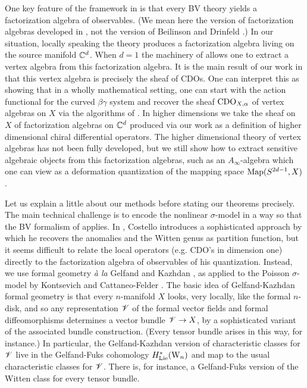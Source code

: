 \documentclass[10pt]{amsart}
\begin{document}
One key feature of the framework in \cite{CG} is that every BV theory yields a factorization algebra of observables. (We mean here the version of factorization algebras developed in \cite{CG}, not the version of Beilinson and Drinfeld \cite{BD}.)
In our situation, locally speaking the theory produces a factorization algebra living on the source manifold $\mathbb C^d$.
When $d=1$ the machinery of \cite{CG} allows one to extract a vertex algebra from this factorization algebra.
It is the main result of our work in \cite{GGW} that this vertex algebra is precisely the sheaf of CDOs.
One can interpret this as showing that in a wholly mathematical setting, one can start with the action functional for the curved $\beta\gamma$ system
and recover the sheaf ${\rm CDO}_{X,\alpha}$ of vertex algebras on $X$ via the algorithms of \cite{CosBook, CG}.
In higher dimensions we take the sheaf on $X$ of factorization algebras on $\mathbb C^d$ produced via our work as a definition of higher dimensional chiral differential operators.
The higher dimensional theory of vertex algebras has not been fully developed, but we still show how to extract sensitive algebraic objects from this factorization algebras, such as an $A_\infty$-algebra which one can view as a deformation quantization of the mapping space ${\rm Map}(S^{2d-1}, X)$. 

Let us explain a little about our methods before stating our theorems precisely. 
The main technical challenge is to encode the nonlinear $\sigma$-model in a way so that the BV formalism of \cite{CostelloRenormalization} applies. 
In \cite{WG2}, Costello introduces a sophisticated approach by which he recovers the anomalies and the Witten genus as partition function, but it seems difficult to relate the local operators (e.g. CDO's in dimension one) directly to the factorization algebra of observables of his quantization. 
Instead, we use formal geometry {\it \`a la} Gelfand and Kazhdan \cite{GK}, as applied to the Poisson $\sigma$-model by Kontsevich \cite{KonDQ} and Cattaneo-Felder \cite{CF}.
The basic idea of Gelfand-Kazhdan formal geometry is that every $n$-manifold $X$ looks, very locally, like the formal $n$-disk, and so any representation $\mathscr V$ of the formal vector fields and formal diffeomorphisms determines a vector bundle $\mathscr V \to X$, by a sophisticated variant of the associated bundle construction. (Every tensor bundle arises in this way, for instance.) In particular, the Gelfand-Kazhdan version of characteristic classes for $\mathscr V$ live in the Gelfand-Fuks cohomology $H^*_{\rm Lie}({{\rm W}_n})$ and map to the usual characteristic classes for $\mathscr V$. There is, for instance, a Gelfand-Fuks version of the Witten class for every tensor bundle.
\end{document}
